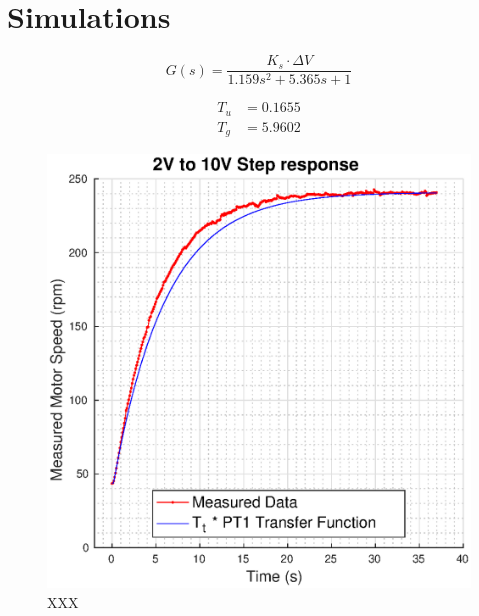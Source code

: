 \section{Simulations}
\begin{equation}
    G(s) = \frac{K_s \cdot \Delta V}{1.159 s^2 + 5.365 s + 1}
\end{equation}

\begin{align}
    T_u  &= 0.1655 \\
    T_g  &= 5.9602
\end{align}

\begin{figure}
    \centering
    \includegraphics[width=\linewidth]{images/Tt_PT1}
    \caption{XXX}
\end{figure}

